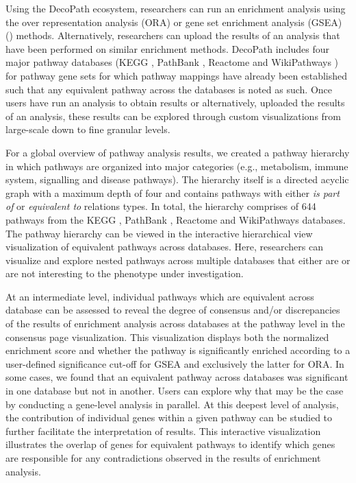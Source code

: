 Using the DecoPath ecosystem, researchers can run an enrichment analysis using the over representation analysis (ORA) or gene set enrichment analysis (GSEA) (\parencite{subramanian2005}) methods. Alternatively, researchers can upload the results of an analysis that have been performed on similar enrichment methods. DecoPath includes four major pathway databases (KEGG \parencite{kanehisa2000}, PathBank \parencite{wishart2020}, Reactome \parencite{jassal2020} and WikiPathways \parencite{martens2021}) for pathway gene sets for which pathway mappings have already been established such that any equivalent pathway across the databases is noted as such. Once users have run an analysis to obtain results or alternatively, uploaded the results of an analysis, these results can be explored through custom visualizations from large-scale down to fine granular levels. 

For a global overview of pathway analysis results, we created a pathway hierarchy in which pathways are organized into major categories (e.g., metabolism, immune system, signalling and disease pathways). The hierarchy itself is a directed acyclic graph with a maximum depth of four and contains pathways with either \textit{is part of} or \textit{equivalent to} relations types. In total, the hierarchy comprises of 644 pathways from the KEGG \parencite{kanehisa2000}, PathBank \parencite{wishart2020}, Reactome \parencite{jassal2020} and WikiPathways \parencite{martens2021} databases. The pathway hierarchy can be viewed in the interactive hierarchical view visualization of equivalent pathways across databases. Here, researchers can visualize and explore nested pathways across multiple databases that either are or are not interesting to the phenotype under investigation. 

At an intermediate level, individual pathways which are equivalent across database can be assessed to reveal the degree of consensus and/or discrepancies of the results of enrichment analysis across databases at the pathway level in the consensus page visualization. This visualization displays both the normalized enrichment score and whether the pathway is significantly enriched according to a user-defined significance cut-off for GSEA and exclusively the latter for ORA. In some cases, we found that an equivalent pathway across databases was significant in one database but not in another. Users can explore why that may be the case by conducting a gene-level analysis in parallel. At this deepest level of analysis, the contribution of individual genes within a given pathway can be studied to further facilitate the interpretation of results. This interactive visualization illustrates the overlap of genes for equivalent pathways to identify which genes are responsible for any contradictions observed in the results of enrichment analysis.

